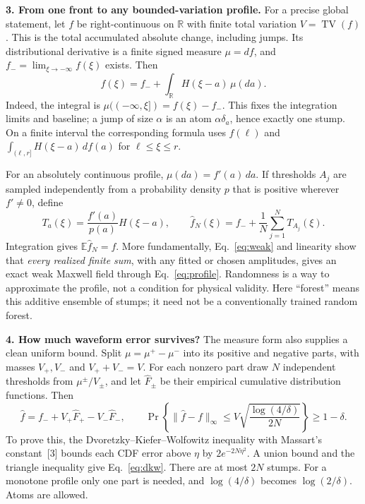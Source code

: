 \documentclass[11pt,letterpaper]{article}
\newcommand{\TV}{\operatorname{TV}}
\begin{document}
\textbf{3. From one front to any bounded-variation profile.}
For a precise global statement, let $f$ be right-continuous on $\mathbb R$ with
finite total variation $V=\TV(f)$. This is the total accumulated absolute change,
including jumps. Its distributional derivative is a finite signed measure
$\mu=df$, and $f_-=\lim_{\xi\to-\infty}f(\xi)$ exists. Then
\begin{equation}
 f(\xi)=f_-+\int_{\mathbb R}H(\xi-a)\,\mu(da).
 \label{eq:stieltjes}
\end{equation}
Indeed, the integral is $\mu(( -\infty,\xi])=f(\xi)-f_-$.
This fixes the integration limits and baseline; a jump of size $\alpha$ is
an atom $\alpha\delta_a$, hence exactly one stump.
On a finite interval the corresponding formula uses $f(\ell)$ and
$\int_{(\ell,r]}H(\xi-a)\,df(a)$ for $\ell\le\xi\le r$.

For an absolutely continuous profile, $\mu(da)=f'(a)\,da$.
If thresholds $A_j$ are sampled independently from a probability density $p$
that is positive wherever $f'\ne0$, define
\begin{equation}
 T_a(\xi)=\frac{f'(a)}{p(a)}H(\xi-a),\qquad
 \widehat f_N(\xi)=f_-+\frac1N\sum_{j=1}^N T_{A_j}(\xi).
 \label{eq:forest}
\end{equation}
Integration gives $\mathbb E\widehat f_N=f$. More fundamentally,
Eq.~\eqref{eq:weak} and linearity show that \emph{every realized finite sum},
with any fitted or chosen amplitudes, gives an exact weak Maxwell field through
Eq.~\eqref{eq:profile}. Randomness is a way to approximate the profile, not a
condition for physical validity. Here ``forest'' means this additive ensemble
of stumps; it need not be a conventionally trained random forest.

\textbf{4. How much waveform error survives?}
The measure form also supplies a clean uniform bound. Split
$\mu=\mu^+-\mu^-$ into its positive and negative parts, with masses
$V_+,V_-$ and $V_++V_-=V$. For each nonzero part draw $N$ independent
thresholds from $\mu^\pm/V_\pm$, and let $\widehat F_\pm$ be their empirical
cumulative distribution functions. Then
\begin{equation}
 \widehat f=f_-+V_+\widehat F_+-V_-\widehat F_-,\qquad
 \Pr\!\left\{\|\widehat f-f\|_\infty
 \le V\sqrt{\frac{\log(4/\delta)}{2N}}\right\}\ge1-\delta.
 \label{eq:dkw}
\end{equation}
To prove this, the Dvoretzky--Kiefer--Wolfowitz inequality with Massart's
constant~[3] bounds each CDF error above $\eta$ by $2e^{-2N\eta^2}$.
A union bound and the triangle inequality give Eq.~\eqref{eq:dkw}.
There are at most $2N$ stumps. For a monotone profile only one part is needed,
and $\log(4/\delta)$ becomes $\log(2/\delta)$. Atoms are allowed.
\end{document}
